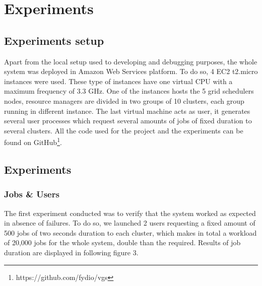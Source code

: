 \section{Experiments}
\subsection{Experiments setup}
Apart from the local setup used to developing and debugging purposes, the whole system was deployed in Amazon Web Services platform. To do so, 4 EC2 t2.micro instances were used. These type of instances have one virtual CPU with a maximum frequency of 3.3 GHz. One of the instances hosts the 5 grid schedulers nodes, resource managers are divided in two groups of 10 clusters, each group running in different instance. The last virtual machine acts as user, it generates several user processes which request several amounts of jobs of fixed duration to several clusters. All the code used for the project and the experiments can be found on GitHub\footnote{https://github.com/fydio/vgs}.
\subsection{Experiments}
\subsubsection{Jobs & Users}
The first experiment conducted was to verify that the system worked as expected in absence of failures. To do so, we launched 2 users requesting a fixed amount of 500 jobs of two seconds duration to each cluster, which makes in total a workload of 20,000 jobs for the whole system, double than the required. Results of job duration are displayed in following figure 3.